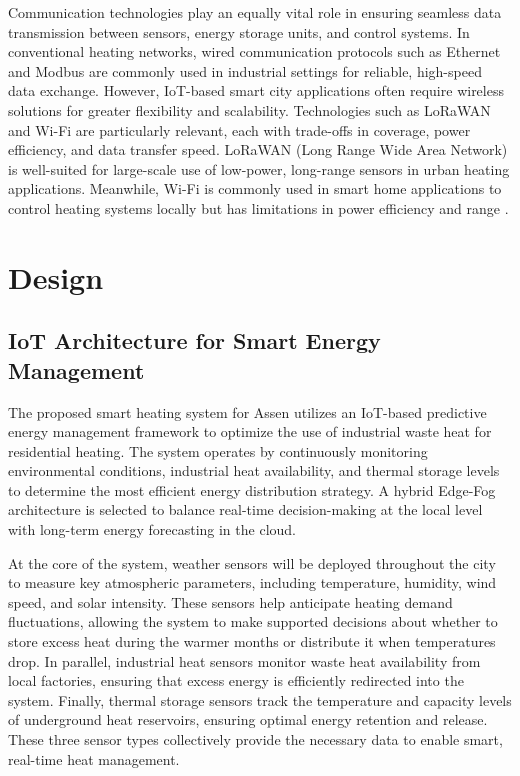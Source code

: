 \documentclass[conference]{IEEEtran}
\begin{document}
Communication technologies play an equally vital role in ensuring seamless data transmission between sensors, energy storage units, and control systems. In conventional heating networks, wired communication protocols such as Ethernet and Modbus are commonly used in industrial settings for reliable, high-speed data exchange. However, IoT-based smart city applications often require wireless solutions for greater flexibility and scalability. Technologies such as LoRaWAN and Wi-Fi are particularly relevant, each with trade-offs in coverage, power efficiency, and data transfer speed. LoRaWAN (Long Range Wide Area Network) is well-suited for large-scale use of low-power, long-range sensors in urban heating applications. Meanwhile, Wi-Fi is commonly used in smart home applications to control heating systems locally but has limitations in power efficiency and range \cite{comm_tech_review}. 

\section{Design}

\subsection{IoT Architecture for Smart Energy Management}

The proposed smart heating system for Assen utilizes an IoT-based predictive energy management framework to optimize the use of industrial waste heat for residential heating. The system operates by continuously monitoring environmental conditions, industrial heat availability, and thermal storage levels to determine the most efficient energy distribution strategy. A hybrid Edge-Fog architecture is selected to balance real-time decision-making at the local level with long-term energy forecasting in the cloud.

At the core of the system, weather sensors will be deployed throughout the city to measure key atmospheric parameters, including temperature, humidity, wind speed, and solar intensity. These sensors help anticipate heating demand fluctuations, allowing the system to make supported decisions about whether to store excess heat during the warmer months or distribute it when temperatures drop. In parallel, industrial heat sensors monitor waste heat availability from local factories, ensuring that excess energy is efficiently redirected into the system. Finally, thermal storage sensors track the temperature and capacity levels of underground heat reservoirs, ensuring optimal energy retention and release. These three sensor types collectively provide the necessary data to enable smart, real-time heat management.
\end{document}
